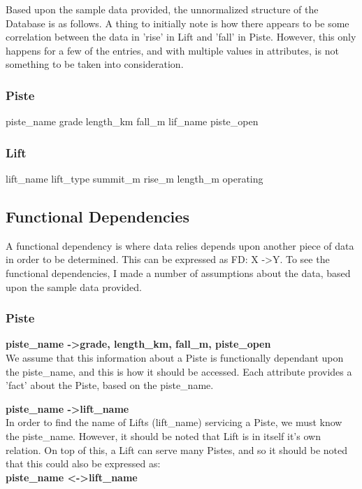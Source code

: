\documentclass[11pt]{scrartcl} %
\begin{document}
Based upon the sample data provided\cite{sample}, the unnormalized structure of the Database is as follows. A thing to initially note is how there appears to be some correlation between the data in 'rise' in Lift and 'fall' in Piste. However, this only happens for a few of the entries, and with multiple values in attributes, is not something to be taken into consideration.

\subsubsection{Piste}
piste\_name\newline
grade\newline
length\_km\newline
fall\_m\newline
lif\_name\newline
piste\_open

\subsubsection{Lift}
lift\_name\newline
lift\_type\newline
summit\_m\newline
rise\_m\newline
length\_m\newline
operating

\subsection{Functional Dependencies}
A functional dependency is where data relies depends upon another piece of data in order to be determined. This can be expressed as FD: X -\textgreater \space Y. To see the functional dependencies, I made a number of assumptions about the data, based upon the sample data provided.
\subsubsection{Piste}
 \textbf{piste\_name -\textgreater  grade, length\_km, fall\_m, piste\_open}
\\[0.1cm]
We assume that this information about a Piste is functionally dependant upon the piste\_name, and this is how it should be accessed. Each attribute provides a 'fact' about the Piste, based on the piste\_name.

\textbf{piste\_name -\textgreater lift\_name}
\\[0.1cm]
In order to find the name of Lifts (lift\_name) servicing a Piste, we must know the piste\_name. However, it should be noted that Lift is in itself it's own relation. On top of this, a Lift can serve many Pistes, and so it should be noted that this could also be expressed as:\\[0.1cm]
\textbf{piste\_name \textless -\textgreater \space lift\_name}
\end{document}
